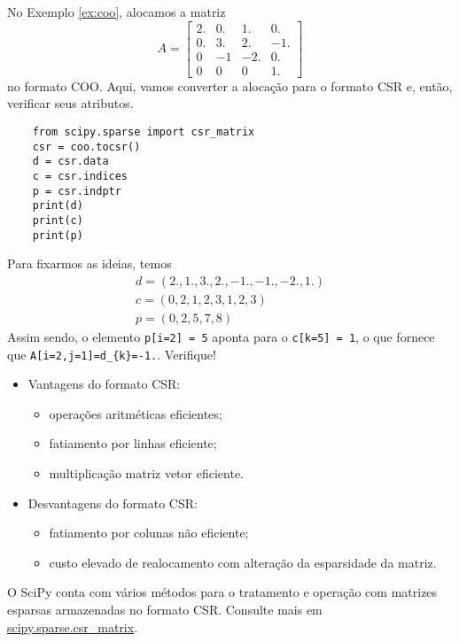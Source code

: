 \begin{ex}
  No Exemplo \ref{ex:coo}, alocamos a matriz
  \begin{equation}
    A =
    \begin{bmatrix}
      2. & 0. & 1.  & 0. \\
      0. & 3. & 2.  & -1.\\
      0  & -1 & -2. & 0. \\
      0  & 0  & 0   & 1.
    \end{bmatrix}
  \end{equation}
  no formato COO. Aqui, vamos converter a alocação para o formato CSR e, então, verificar seus atributos.
  \begin{lstlisting}
    from scipy.sparse import csr_matrix
    csr = coo.tocsr()
    d = csr.data
    c = csr.indices
    p = csr.indptr
    print(d)
    print(c)
    print(p)
  \end{lstlisting}
  Para fixarmos as ideias, temos
  \begin{gather}
    d = (2., 1., 3., 2., -1., -1., -2., 1.)\\
    c = (0, 2, 1, 2, 3, 1, 2, 3)\\
    p = (0, 2, 5, 7, 8)
  \end{gather}
  Assim sendo, o elemento \lstinline+p[i=2] = 5+ aponta para o \lstinline+c[k=5] = 1+, o que fornece que \lstinline+A[i=2,j=1]=d_{k}=-1.+. Verifique!
\end{ex}

\begin{itemize}
\item Vantagens do formato CSR:
  \begin{itemize}
  \item operações aritméticas eficientes;
  \item fatiamento por linhas eficiente;
  \item multiplicação matriz vetor eficiente.
  \end{itemize}
\item Desvantagens do formato CSR:
  \begin{itemize}
  \item fatiamento por colunas não eficiente;
  \item custo elevado de realocamento com alteração da esparsidade da matriz.
  \end{itemize}
\end{itemize}

\begin{obs}
  O SciPy conta com vários métodos para o tratamento e operação com matrizes esparsas armazenadas no formato CSR. Consulte mais em \href{https://docs.scipy.org/doc/scipy/reference/generated/scipy.sparse.csr_matrix.html}{scipy.sparse.csr\_matrix}.
\end{obs}


